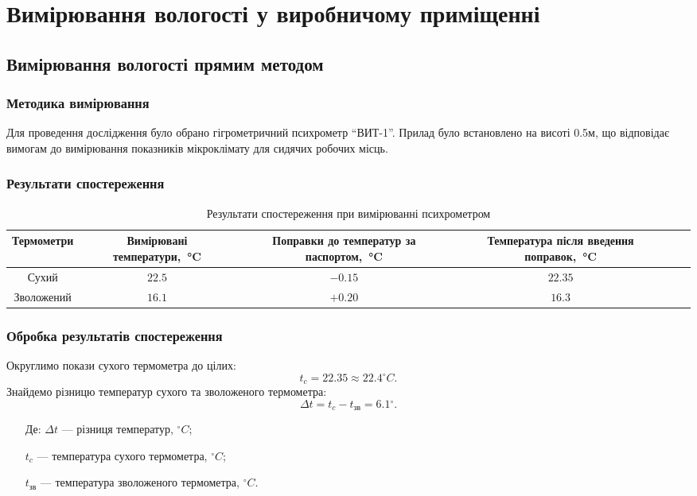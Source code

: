 \chapter{Вимірювання вологості у виробничому приміщенні}

\section{Вимірювання вологості прямим методом}

\subsection{Методика вимірювання}

Для проведення дослідження було обрано гігрометричний психрометр ``ВИТ-1''.  Прилад було
встановлено на висоті 0.5м, що відповідає вимогам до вимірювання показників мікроклімату для сидячих
робочих місць.

\subsection{Результати спостереження}

\begin{table}[ht]
  \centering
  \caption{Результати спостереження при вимірюванні психрометром}
\label{t:results_direct}
\begin{tabular}{| c | c | c | c | c | c |}
\hline
\multicolumn{1}{|C{3cm}|}{Термометри} &
\multicolumn{1}{C{3.5cm}|}{Вимірювані температури,~°C} &
\multicolumn{1}{C{3.5cm}|}{Поправки до температур за паспортом,~°C} &
\multicolumn{1}{C{5cm}|}{Температура після введення поправок,~°C} \\ \hline 
Сухий  & $22.5$ & $-0.15$ & $22.35$ \\ \hline 
Зволожений & $16.1$ & $+0.20$ & $16.3$ \\ \hline 
\end{tabular}
\end{table}

\subsection{Обробка результатів спостереження}

Округлимо покази сухого термометра до цілих: 
\begin{equation}
  t_c = 22.35 \approx 22.4{^\circ}C.
\end{equation}
Знайдемо різницю температур сухого та зволоженого термометра:
\begin{equation}
\Delta t = t_{c}-t_{\text{зв}} = 6.1{^\circ}.
\end{equation}
\begin{itemize}
\item [Де:] $\Delta t$ --- різниця температур, ${^\circ}C$;
\item []$t_{c}$ ---  температура сухого термометра, ${^\circ}C$;
\item []$t_{\text{зв}}$ --- температура зволоженого термометра, ${^\circ}C$.
\end{itemize}


